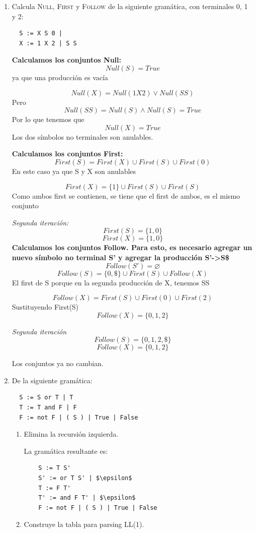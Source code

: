 \documentclass[12pt, letterpaper]{article}
\begin{document}
\begin{enumerate}
\[Follow(E) = \{\$, ;, else, then\}\]

Los conjuntos ya no crecen más.

\item Calcula \textsc{Null, First} y \textsc{Follow} de la siguiente gramática, con terminales 0, 1 y 2:
\begin{verbatim}
  S := X S 0 |
  X := 1 X 2 | S S
\end{verbatim}

\textbf{Calculamos los conjuntos Null:}
\[
Null(S) = True
\]
ya que una producción es vacía

\[
Null(X) = Null(1X2) \vee Null(SS)
\]
Pero
\[
Null(SS) = Null(S) \wedge Null(S) = True
\]
Por lo que tenemos que
\[
Null(X) = True
\]
Los dos símbolos no terminales son anulables.

\textbf{Calculamos los conjuntos First:}
\[
First(S) = First(X) \cup First(S) \cup First(0)
\]
En este caso ya que S y X son anulables

\[
First(X) = \{1\} \cup First(S) \cup First(S)
\]
Como ambos first se contienen, se tiene que el first de ambos, es el mismo conjunto

\textit{Segunda iteración:}
\[
First(S) = \{1, 0\}
\]
\[
First(X) = \{1, 0\}
\]
\textbf{Calculamos los conjuntos Follow. Para esto, es necesario agregar un nuevo símbolo no terminal S' y agregar la producción S'->S\$}
\[
Follow(S') = \varnothing
\]
\[
Follow(S) = \{0, \$\} \cup First(S) \cup Follow(X)
\]
El first de S porque en la segunda producción de X, tenemos SS

\[
Follow(X) = First(S) \cup First(0) \cup First(2)
\]
Sustituyendo First(S)
\[
Follow(X) = \{0, 1, 2\}
\]

\textit{Segunda iteración}
\[
Follow(S) = \{0, 1, 2, \$ \}
\]
\[
Follow(X) = \{0, 1, 2\}
\]

Los conjuntos ya no cambian.
\item De la siguiente gramática:
\begin{verbatim}
  S := S or T | T
  T := T and F | F
  F := not F | ( S ) | True | False
\end{verbatim}
\begin{enumerate}[label=(\alph*)]
\item Elimina la recursión izquierda.
  
  La gramática resultante es:
  \begin{lstlisting}
    S := T S'
    S' := or T S' | $\epsilon$
    T := F T'
    T' := and F T' | $\epsilon$
    F := not F | ( S ) | True | False
  \end{lstlisting}
\item Construye la tabla para parsing LL(1).
  

\end{enumerate}
\end{enumerate}
\end{document}
